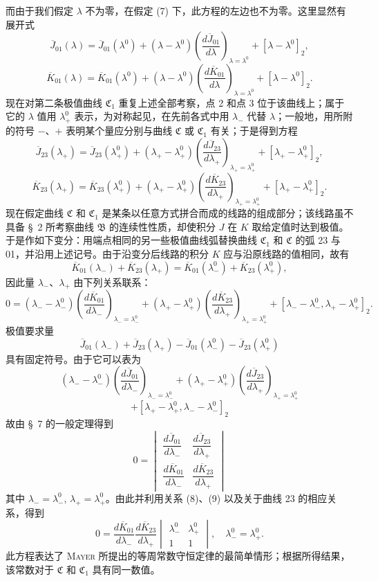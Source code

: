 \documentclass[11pt,a4paper,leqno]{article}
\begin{document}
而由于我们假定 $\lambda$ 不为零，在假定 (7) 下，此方程的左边也不为零。这里显然有展开式
\[
\overline{J}_{01}(\lambda)=\overline{J}_{01}(\lambda^0)+(\lambda-\lambda^0)\left(\frac{d\overline{J}_{01}}{d\lambda}\right)_{\lambda=\lambda^0}+[\lambda-\lambda^0]_2,
\]
\[
\overline{K}_{01}(\lambda)=\overline{K}_{01}(\lambda^0)+(\lambda-\lambda^0)\left(\frac{d\overline{K}_{01}}{d\lambda}\right)_{\lambda=\lambda^0}+[\lambda-\lambda^0]_2.
\]
现在对第二条极值曲线 $\mathfrak{C}_1$ 重复上述全部考察，点 2 和点 3 位于该曲线上；属于它的 $\lambda$ 值用 $\lambda_+^0$ 表示，为对称起见，在先前各式中用 $\lambda_-$ 代替 $\lambda$；一般地，用所附的符号 $-$、$+$ 表明某个量应分别与曲线 $\mathfrak{C}$ 或 $\mathfrak{C}_1$ 有关；于是得到方程
\[
\overline{J}_{23}(\lambda_+)=\overline{J}_{23}(\lambda_+^0)+
(\lambda_+-\lambda_+^0)\left(\frac{d\overline{J}_{23}}{d\lambda_+}\right)_{\lambda_+=\lambda_+^0}
+[\lambda_+-\lambda_+^0]_2,
\]
\[
\overline{K}_{23}(\lambda_+)=\overline{K}_{23}(\lambda_+^0)+
(\lambda_+-\lambda_+^0)\left(\frac{d\overline{K}_{23}}{d\lambda_+}\right)_{\lambda_+=\lambda_+^0}
+[\lambda_+-\lambda_+^0]_2.
\]
现在假定曲线 $\mathfrak{C}$ 和 $\mathfrak{C}_1$ 是某条以任意方式拼合而成的线路的组成部分；该线路虽不具备 \S~2 所考察曲线 $\mathfrak{B}$ 的连续性性质，却使积分 $J$ 在 $K$ 取给定值时达到极值。于是作如下变分：用端点相同的另一些极值曲线弧替换曲线 $\mathfrak{C}_1$ 和 $\mathfrak{C}$ 的弧 23 与 01，并沿用上述记号。由于沿变分后线路的积分 $K$ 应与沿原线路的值相同，故有
\[
\overline{K}_{01}(\lambda_-)+\overline{K}_{23}(\lambda_+)
=\overline{K}_{01}(\lambda_-^0)+\overline{K}_{23}(\lambda_+^0),
\]
因此量 $\lambda_-$、$\lambda_+$ 由下列关系联系：
\[
0=(\lambda_- -\lambda_-^0)\left(\frac{d\overline{K}_{01}}{d\lambda_-}\right)_{\lambda_- =\lambda_-^0}
+(\lambda_+ -\lambda_+^0)\left(\frac{d\overline{K}_{23}}{d\lambda_+}\right)_{\lambda_+ =\lambda_+^0}
+[\lambda_- -\lambda_-^0,\lambda_+ -\lambda_+^0]_2.
\]
极值要求量
\[
\overline{J}_{01}(\lambda_-)+\overline{J}_{23}(\lambda_+)-\overline{J}_{01}(\lambda_-^0)-\overline{J}_{23}(\lambda_+^0)
\]
具有固定符号。由于它可以表为
\[
(\lambda_- -\lambda_-^0)\left(\frac{d\overline{J}_{01}}{d\lambda_-}\right)_{\lambda_- =\lambda_-^0}
+(\lambda_+ -\lambda_+^0)\left(\frac{d\overline{J}_{23}}{d\lambda_+}\right)_{\lambda_+ =\lambda_+^0}
\]
\[
+[\lambda_+ -\lambda_+^0,\lambda_- -\lambda_-^0]_2
\]
故由 \S~7 的一般定理得到
\[
0=
\begin{vmatrix}
\dfrac{d\overline{J}_{01}}{d\lambda_-}&\dfrac{d\overline{J}_{23}}{d\lambda_+}\\[1.2ex]
\dfrac{d\overline{K}_{01}}{d\lambda_-}&\dfrac{d\overline{K}_{23}}{d\lambda_+}
\end{vmatrix}
\]
其中 $\lambda_- =\lambda_-^0$, $\lambda_+ =\lambda_+^0$。由此并利用关系 (8)、(9) 以及关于曲线 23 的相应关系，得到
\[
0=\frac{d\overline{K}_{01}}{d\lambda_-}\frac{d\overline{K}_{23}}{d\lambda_+}
\begin{vmatrix}
\lambda_-^0&\lambda_+^0\\
1&1
\end{vmatrix},
\quad \lambda_-^0=\lambda_+^0.
\]
此方程表达了 \textsc{Mayer} 所提出的等周常数守恒定律的最简单情形；根据所得结果，该常数对于 $\mathfrak{C}$ 和 $\mathfrak{C}_1$ 具有同一数值。
\end{document}
